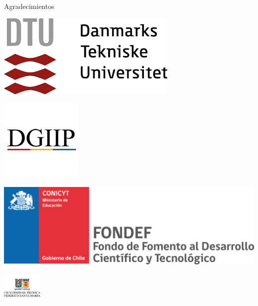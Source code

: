 \documentclass[mathserif,10pt]{beamer}
\begin{document}
\begin{frame}{Agradecimientos}
	\vspace{-0.5cm}
	\begin{minipage}{0.5\linewidth}
		\centering
		\includegraphics[width=0.9\linewidth]{fig/agrad/dtu}%
	\end{minipage}%
	\begin{minipage}{0.5\linewidth}
		\centering
		\includegraphics[width=0.6\linewidth]{fig/agrad/dgiip}%
	\end{minipage}%
	
	\vspace{0.7cm}
	\centering
	\includegraphics[width=0.7\linewidth]{fig/agrad/conicyt}%
\end{frame}

\begin{frame}
	\vspace{0.3cm}
	\begin{center} \includegraphics[height=1.5cm]{utfsm_logo} \end{center}
	\vspace{-0.5cm}
	\titlepage
\end{frame}
\end{document}
